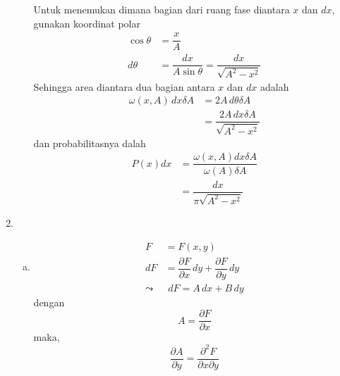 \begin{enumerate}
\begin{enumerate}[(a)]
\begin{equation*}
        \end{equation*}
        Untuk menemukan dimana bagian dari ruang fase diantara $x$ dan $dx$, gunakan koordinat polar
        \begin{equation*}
            \begin{split}
                \cos\theta&=\dfrac{x}{A}\\
                d\theta&=\dfrac{dx}{A\sin\theta}=\dfrac{dx}{\sqrt{A^2-x^2}}
            \end{split}
        \end{equation*}
        Sehingga area diantara dua bagian antara $x$ dan $dx$ adalah
        \begin{equation*}
            \begin{split}
                \omega(x,A)\,dx\delta A&=2A\,d\theta\delta A\\
                &=\dfrac{2A\,dx\delta A}{\sqrt{A^2-x^2}}
            \end{split}
        \end{equation*}
        dan probabilitasnya dalah
        \begin{equation*}
            \begin{split}
                P(x)dx&=\dfrac{\omega(x,A)dx\delta A}{\omega(A)\delta A}\\
                &=\dfrac{dx}{\pi\sqrt{A^2-x^2}}
            \end{split}
        \end{equation*}
    \end{enumerate}
    \item 
    \begin{enumerate}[(a)]
        \item 
        \begin{equation*}
            \begin{split}
                F&=F(x,y)\\
                dF&=\dfrac{\partial F}{\partial x}\,dy+\dfrac{\partial F}{\partial y}\,dy\\
                \leadsto&\,\,dF=A\,dx+B\,dy
            \end{split}
        \end{equation*}
        dengan
        \begin{equation*}
            A=\dfrac{\partial F}{\partial x}
        \end{equation*}
        maka, 
        \begin{equation*}
            \dfrac{\partial A}{\partial y}=\dfrac{\partial^2 F}{\partial x\partial y}

\end{equation*}
\end{enumerate}
\end{enumerate}
